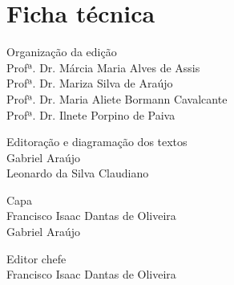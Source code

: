 \chapter{Ficha técnica}

{
\raggedright\footnotesize

Organização da edição\\
\hspace{1.5em}Profª. Dr. Márcia Maria Alves de Assis\\
\hspace{1.5em}Profª. Dr. Mariza Silva de Araújo\\
\hspace{1.5em}Profª. Dr. Maria Aliete Bormann Cavalcante\\
\hspace{1.5em}Profª. Dr. Ilnete Porpino de Paiva

\vspace{5mm}

\begin{minipage}[t]{.5\textwidth}
\raggedright
Editoração e diagramação dos textos\\
\hspace{1.5em}Gabriel Araújo\\
\hspace{1.5em}Leonardo da Silva Claudiano
\end{minipage}%
\begin{minipage}[t]{.5\textwidth}
\raggedright
Capa\\
\hspace{1.5em}Francisco Isaac Dantas de Oliveira\\
\hspace{1.5em}Gabriel Araújo
\end{minipage}%

\vspace{5mm}

Editor chefe\\
\hspace{1.5em}Francisco Isaac Dantas de Oliveira

\vspace{5mm}

}

